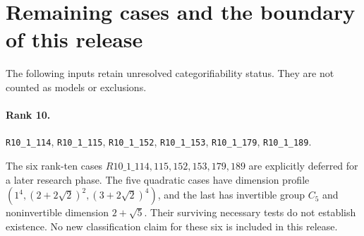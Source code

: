 \section{Remaining cases and the boundary of this release}

The following inputs retain unresolved categorifiability status. They are not counted as models or exclusions.

\paragraph{Rank 10.} \texttt{R10\_1\_114}, \texttt{R10\_1\_115}, \texttt{R10\_1\_152}, \texttt{R10\_1\_153}, \texttt{R10\_1\_179}, \texttt{R10\_1\_189}.

The six rank-ten cases $R10\_1\_114,115,152,153,179,189$ are explicitly deferred for a later research phase. The five quadratic cases have dimension profile $(1^4,(2+2\sqrt2)^2,(3+2\sqrt2)^4)$, and the last has invertible group $C_5$ and noninvertible dimension $2+\sqrt5$. Their surviving necessary tests do not establish existence. No new classification claim for these six is included in this release.
